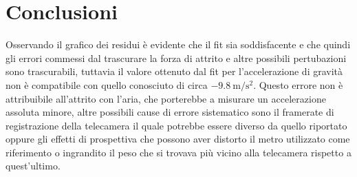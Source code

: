 \documentclass[a4paper]{article}
\begin{document}
    \section{Conclusioni}
    Osservando il grafico dei residui è evidente che il fit sia soddisfacente e che
    quindi gli errori commessi dal trascurare la forza di attrito e altre possibili
    pertubazioni sono trascurabili, tuttavia il valore ottenuto dal fit per l'accelerazione
    di gravità non è compatibile con quello conosciuto di circa $\SI{-9.8}{\m\per\s^2}$.
    Questo errore non è attribuibile all'attrito con l'aria, che porterebbe a misurare un
    accelerazione assoluta minore, altre possibili cause di errore sistematico sono 
    il framerate di registrazione della telecamera il quale potrebbe essere diverso da quello
    riportato oppure gli effetti di prospettiva che possono aver distorto il metro
    utilizzato come riferimento o ingrandito il peso che si trovava più vicino alla
    telecamera rispetto a quest'ultimo.
\end{document}
